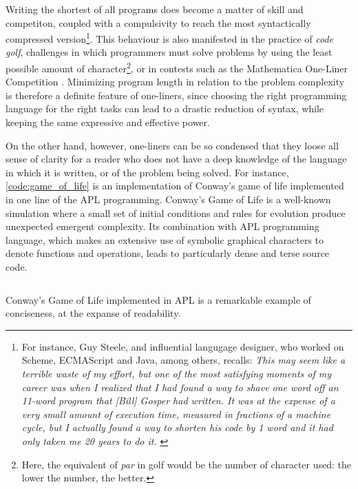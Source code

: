 Writing the shortest of all programs does become a matter of skill and competiton, coupled with a compulsivity to reach the most syntactically compressed version\footnote{For instance, Guy Steele, and influential langugage designer, who worked on Scheme, ECMAScript and Java, among others, recalls:
  \emph{This may seem like a terrible waste of my effort, but one of the most satisfying moments of my career was when I realized that I had found a way to shave one word off an 11-word program that [Bill] Gosper had written. It was at the expense of a very small amount of execution time, measured in fractions of a machine cycle, but I actually found a way to shorten his code by 1 word and it had only taken me 20 years to do it. }\citep{seibel_coders_2009}}.
This behaviour is also manifested in the practice of \emph{code golf}, challenges in which programmers must solve problems by using the least possible amount of character\footnote{Here, the equivalent of \emph{par} in golf would be the number of character used: the lower the number, the better.}, or in contests such as the Mathematica One-Liner Competition \citep{carlson_mathematica_2010}. Minimizing program length in relation to the problem complexity is therefore a definite feature of one-liners, since choosing the right programming language for the right tasks can lead to a drastic reduction of syntax, while keeping the same expressive and effective power.

On the other hand, however, one-liners can be so condensed that they loose all sense of clarity for a reader who does not have a deep knowledge of the language in which it is written, or of the problem being solved. For instance, \ref{code:game_of_life} is an implementation of Conway's game of life implemented in one line of the APL programming. Conway's Game of Life is a well-known simulation where a small set of initial conditions and rules for evolution produce unexpected emergent complexity. Its combination with APL programming language, which makes an extensive use of symbolic graphical characters to denote functions and operations, leads to particularly dense and terse source code.

\begin{listing}
  \inputminted{text}{./corpus/game_of_life.apl}
  \caption{Conway's Game of Life implemented in APL is a remarkable example of conciseness, at the expanse of readability.}
  \label{code:game_of_life}
\end{listing}

